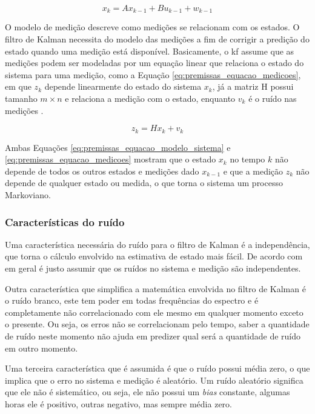 \documentclass[acronym, symbols, table, deposito]{fei}
\begin{document}
				\begin{equation}\label{eq:premissas_equacao_modelo_sistema}
					x_k = Ax_{k-1} + Bu_{k-1} + w_{k-1}
				\end{equation}
			
				O modelo de medição descreve como medições se relacionam com os estados. O filtro de Kalman necessita do modelo das medições a fim de corrigir a predição do estado quando uma medição está disponível. Basicamente, o \acrshort{kf} assume que as medições podem ser modeladas por um equação linear que relaciona o estado do sistema para uma medição, como a Equação \eqref{eq:premissas_equacao_medicoes}, em que $z_k$ depende linearmente do estado do sistema $x_k$, já a matriz H possui tamanho $m \times n$ e relaciona a medição com o estado, enquanto $v_k$ é o ruído nas medições \cite{khodarahmi2023review}.
				
				\begin{equation}\label{eq:premissas_equacao_medicoes}
					z_k = Hx_k + v_k
				\end{equation}
			
				Ambas Equações \eqref{eq:premissas_equacao_modelo_sistema} e \eqref{eq:premissas_equacao_medicoes} mostram que o estado $x_k$ no tempo $k$ não depende de todos os outros estados e medições dado $x_{k-1}$ e que a medição $z_k$ não depende de qualquer estado ou medida, o que torna o sistema um processo Markoviano.
			
			\subsubsection{Características do ruído}
				
				Uma característica necessária do ruído para o filtro de Kalman é a independência, que torna o cálculo envolvido na estimativa de estado mais fácil. De acordo com \textcite{phdthesisNegenborn} em geral é justo assumir que os ruídos no sistema e medição são independentes.
				
				Outra característica que simplifica a matemática envolvida no filtro de Kalman é o ruído branco, este tem poder em todas frequências do espectro e é completamente não correlacionado com ele mesmo em qualquer momento exceto o presente. Ou seja, os erros não se correlacionam pelo tempo, saber a quantidade de ruído neste momento não ajuda em predizer qual será a quantidade de ruído em outro momento.
				
				Uma terceira característica que é assumida é que o ruído possui média zero, o que implica que o erro no sistema e medição é aleatório. Um ruído aleatório significa que ele não é sistemático, ou seja, ele não possui um \textit{bias} constante, algumas horas ele é positivo, outras negativo, mas sempre média zero.
				
\end{document}
